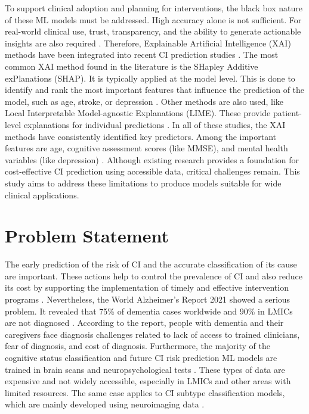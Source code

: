 To support clinical adoption and planning for interventions, the black box nature of these ML models must be addressed. High accuracy alone is not sufficient. For real-world clinical use, trust, transparency, and the ability to generate actionable insights are also required \cite{Martin2023Interpretable}. Therefore, Explainable Artificial Intelligence (\acrshort{XAI}) methods have been integrated into recent CI prediction studies \cite{Martin2023Interpretable}. The most common XAI method found in the literature is the SHapley Additive exPlanations (\acrshort{SHAP}). It is typically applied at the model level. This is done to identify and rank the most important features that influence the prediction of the model, such as age, stroke, or depression \cite{Georgiev2024Predicting, Hossain2025Optimizing, Li2023Early}. Other methods are also used, like Local Interpretable Model-agnostic Explanations (\acrshort{LIME}). These provide patient-level explanations for individual predictions \cite{abbas2024Explainable, Mahamud2025Enhancing, Vyas2022Identifying}. In all of these studies, the XAI methods have consistently identified key predictors. Among the important features are age, cognitive assessment scores (like MMSE), and mental health variables (like depression) \cite{Akter2025Using, Basta2023Personalized, Twait2023Dementia}. Although existing research provides a foundation for cost-effective CI prediction using accessible data, critical challenges remain. This study aims to address these limitations to produce models suitable for wide clinical applications.

\section{Problem Statement}
The early prediction of the risk of CI and the accurate classification of its cause are important. These actions help to control the prevalence of CI and also reduce its cost by supporting the implementation of timely and effective intervention programs \cite{Panegyres2016Early, Rasmussen2019Alzheimers}. Nevertheless, the World Alzheimer’s Report 2021 showed a serious problem. It revealed that 75\% of dementia cases worldwide and 90\% in LMICs are not diagnosed \cite{Gauthier2021World}. According to the report, people with dementia and their caregivers face diagnosis challenges related to lack of access to trained clinicians, fear of diagnosis, and cost of diagnosis. Furthermore, the majority of the cognitive status classification and future CI risk prediction ML models are trained in brain scans and neuropsychological tests \cite{Kaur2024Systematic}. These types of data are expensive and not widely accessible, especially in LMICs and other areas with limited resources. The same case applies to CI subtype classification models, which are mainly developed using neuroimaging data \cite{Wang2024Understanding}.

